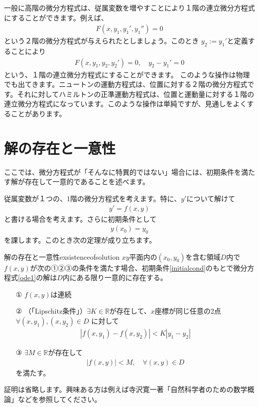 \documentclass[report,paper=a4, fontsize=12pt, line_length=16cm, number_of_lines=33,dvipdfmx]{jlreq}
\numberwithin{equation}{section}
\newcommand{\Rb}{\mathbb{R}}
\begin{document}
一般に高階の微分方程式は、従属変数を増やすことにより１階の連立微分方程式にすることができます。例えば、
\begin{align}
  F(x,y_1,y_1',y_1'')=0
\end{align}
という２階の微分方程式が与えられたとしましょう。このとき
$y_2:=y_1'$と定義することにより
\begin{align}
  F(x,y_1,y_2,y_2')=0,\quad y_2-y_1'=0
\end{align}
という、１階の連立微分方程式にすることができます。
このような操作は物理でも出てきます。ニュートンの運動方程式は、位置に対する２階の微分方程式です。それに対してハミルトンの正準運動方程式は、位置と運動量に対する１階の連立微分方程式になっています。このような操作は単純ですが、見通しをよくすることがあります。

\section{解の存在と一意性}\label{sec:exsistenceofsolution}
ここでは、微分方程式が「そんなに特異的ではない」場合には、初期条件を満たす解が存在して一意的であることを述べます。

従属変数が１つの、1階の微分方程式を考えます。特に、$y'$について解けて
\begin{align}
  y'=f(x,y)\label{ode1}
\end{align}
と書ける場合を考えます。さらに初期条件として
\begin{align}
  y(x_0)=y_0\label{initialcond}
\end{align}
を課します。このとき次の定理が成り立ちます。
\begin{theor}{解の存在と一意性}{exsistenceofsolution}
  $xy$平面内の$(x_0,y_0)$を含む領域$D$内で$f(x,y)$が次の①②③の条件を満たす場合、初期条件\eqref{initialcond}のもとで微分方程式\eqref{ode1}の解は$D$内にある限り一意的に存在する。
  \begin{itemize}
    \item[①] $f(x,y)$は連続
    \item[②] （「Lipschitz条件」）$\exists K\in \Rb$が存在して、$x$座標が同じ任意の2点$\forall (x,y_1),(x,y_2)\in D$ に対して
    \begin{align}
      |f(x,y_1)-f(x,y_2)|< K|y_1-y_2|
    \end{align}
    \item[③] $\exists M \in \Rb$が存在して
    \begin{align}
      |f(x,y)|<M,\quad \forall (x,y)\in D
    \end{align}
    を満たす。
  \end{itemize}
\end{theor}
証明は省略します。興味ある方は例えば寺沢寛一著「自然科学者のための数学概論」などを参照してください。
\end{document}

